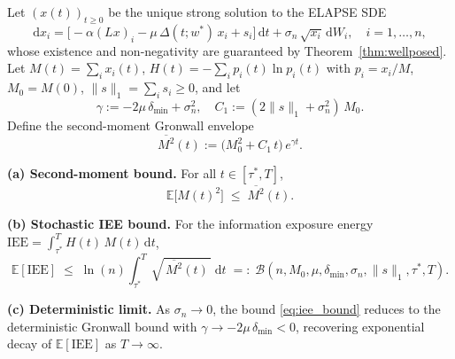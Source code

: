 %

\begin{theorem}
\label{thm:iee_bound}
Let $(x(t))_{t \ge 0}$ be the unique strong solution to the ELAPSE SDE
\begin{equation}
  \mathrm{d}x_i = \bigl[-\alpha (Lx)_i - \mu\,\Delta(t;w^*)\,x_i + s_i\bigr]\,\mathrm{d}t
                  + \sigma_n\,\sqrt{x_i}\,\mathrm{d}W_i, \quad i=1,\ldots,n,
  \label{eq:elapse_sde}
\end{equation}
whose existence and non-negativity are guaranteed by Theorem~\ref{thm:wellposed}.
Let $M(t)=\sum_i x_i(t)$, $H(t)=-\sum_i p_i(t)\ln p_i(t)$ with $p_i=x_i/M$,
$M_0=M(0)$, $\|s\|_1=\sum_i s_i\ge 0$, and let
\begin{equation}
  \gamma := -2\mu\,\delta_{\min} + \sigma_n^2,
  \quad
  C_1 := (2\|s\|_1 + \sigma_n^2)\,M_0.
  \label{eq:gronwall_constants}
\end{equation}
Define the second-moment Gronwall envelope
\begin{equation}
  \overline{M^2}(t) := \bigl(M_0^2 + C_1\,t\bigr)\,e^{\gamma t}.
  \label{eq:M2_bound}
\end{equation}

\medskip
\noindent\textbf{(a) Second-moment bound.}
For all $t\in[\tau^*,T]$,
\begin{equation}
  \mathbb{E}\bigl[M(t)^2\bigr] \;\le\; \overline{M^2}(t).
  \label{eq:E_M2_bound}
\end{equation}

\medskip
\noindent\textbf{(b) Stochastic IEE bound.}
For the information exposure energy
$\mathrm{IEE}=\int_{\tau^*}^{T} H(t)\,M(t)\,\mathrm{d}t$,
\begin{equation}
  \mathbb{E}[\mathrm{IEE}]
  \;\le\;
  \ln(n)\int_{\tau^*}^{T} \sqrt{\,\overline{M^2}(t)\,}\;\mathrm{d}t
  \;=:\;
  \mathcal{B}(n,M_0,\mu,\delta_{\min},\sigma_n,\|s\|_1,\tau^*,T).
  \label{eq:iee_bound}
\end{equation}

\medskip
\noindent\textbf{(c) Deterministic limit.}
As $\sigma_n\to 0$, the bound \eqref{eq:iee_bound} reduces to the
deterministic Gronwall bound with $\gamma\to-2\mu\,\delta_{\min}<0$,
recovering exponential decay of $\mathbb{E}[\mathrm{IEE}]$ as $T\to\infty$.
\end{theorem}

